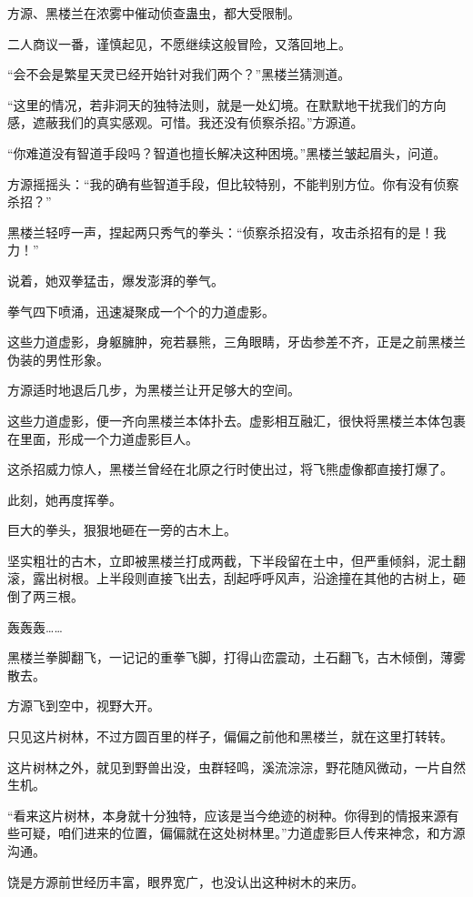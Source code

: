 \begin{this_body}
方源、黑楼兰在浓雾中催动侦查蛊虫，都大受限制。

二人商议一番，谨慎起见，不愿继续这般冒险，又落回地上。

“会不会是繁星天灵已经开始针对我们两个？”黑楼兰猜测道。

“这里的情况，若非洞天的独特法则，就是一处幻境。在默默地干扰我们的方向感，遮蔽我们的真实感观。可惜。我还没有侦察杀招。”方源道。

“你难道没有智道手段吗？智道也擅长解决这种困境。”黑楼兰皱起眉头，问道。

方源摇摇头：“我的确有些智道手段，但比较特别，不能判别方位。你有没有侦察杀招？”

黑楼兰轻哼一声，捏起两只秀气的拳头：“侦察杀招没有，攻击杀招有的是！我力！”

说着，她双拳猛击，爆发澎湃的拳气。

拳气四下喷涌，迅速凝聚成一个个的力道虚影。

这些力道虚影，身躯臃肿，宛若暴熊，三角眼睛，牙齿参差不齐，正是之前黑楼兰伪装的男性形象。

方源适时地退后几步，为黑楼兰让开足够大的空间。

这些力道虚影，便一齐向黑楼兰本体扑去。虚影相互融汇，很快将黑楼兰本体包裹在里面，形成一个力道虚影巨人。

这杀招威力惊人，黑楼兰曾经在北原之行时使出过，将飞熊虚像都直接打爆了。

此刻，她再度挥拳。

巨大的拳头，狠狠地砸在一旁的古木上。

坚实粗壮的古木，立即被黑楼兰打成两截，下半段留在土中，但严重倾斜，泥土翻滚，露出树根。上半段则直接飞出去，刮起呼呼风声，沿途撞在其他的古树上，砸倒了两三根。

轰轰轰……

黑楼兰拳脚翻飞，一记记的重拳飞脚，打得山峦震动，土石翻飞，古木倾倒，薄雾散去。

方源飞到空中，视野大开。

只见这片树林，不过方圆百里的样子，偏偏之前他和黑楼兰，就在这里打转转。

这片树林之外，就见到野兽出没，虫群轻鸣，溪流淙淙，野花随风微动，一片自然生机。

“看来这片树林，本身就十分独特，应该是当今绝迹的树种。你得到的情报来源有些可疑，咱们进来的位置，偏偏就在这处树林里。”力道虚影巨人传来神念，和方源沟通。

饶是方源前世经历丰富，眼界宽广，也没认出这种树木的来历。


\end{this_body}
